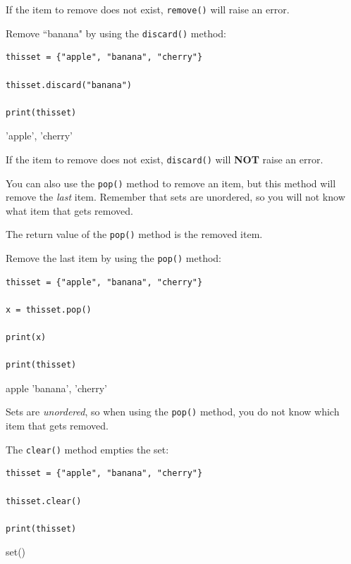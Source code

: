 \documentclass[12pt,a4paper]{article}
\newcommand{\code}[1]{%
	\colorbox{backcolour}{\lstinline{#1}}%
}
\newcommand{\lcode}[1]{%
	\lstinline{#1}%
}
\begin{document}
\begin{nbox}
	If the item to remove does not exist, \code{remove()} will raise an error.
\end{nbox}

\begin{ebox}
Remove ``banana" by using the \lcode{discard()} method:
	\begin{lstlisting}
thisset = {"apple", "banana", "cherry"}

thisset.discard("banana")

print(thisset)
	\end{lstlisting}
\tcblower
	\begin{vercode}
{'apple', 'cherry'}
	\end{vercode}
\end{ebox}

\begin{nbox}
If the item to remove does not exist, \code{discard()} will \textbf{NOT} raise
an error.
\end{nbox}

You can also use the \code{pop()} method to remove an item, but this method
will remove the \textit{last} item. Remember that sets are unordered, so you
will not know what item that gets removed.

The return value of the \code{pop()} method is the removed item.

\begin{ebox}
Remove the last item by using the \lcode{pop()} method:
	\begin{lstlisting}
thisset = {"apple", "banana", "cherry"}

x = thisset.pop()

print(x)

print(thisset)
	\end{lstlisting}
\tcblower
	\begin{vercode}
apple
{'banana', 'cherry'}
	\end{vercode}
\end{ebox}

\begin{nbox}
Sets are \textit{unordered}, so when using the \code{pop()} method, you do not
know which item that gets removed.
\end{nbox}

\begin{ebox}
The \lcode{clear()} method empties the set:
	\begin{lstlisting}
thisset = {"apple", "banana", "cherry"}

thisset.clear()

print(thisset) 
	\end{lstlisting}
\tcblower
	\begin{vercode}
set()
	\end{vercode}
\end{ebox}
\end{document}
